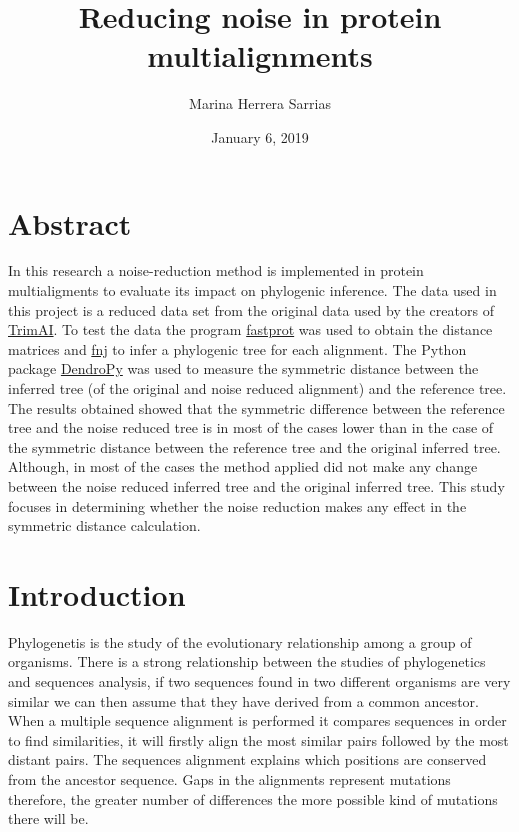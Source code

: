\documentclass[12pt]{article}
\begin{document}
		
\title{Reducing noise in protein multialignments}
\posttitle{\par\end{center}\vspace{-1em}}
\author{Marina Herrera Sarrias}
\date{January 6, 2019}                    %
\maketitle

\section{Abstract}

In this research a noise-reduction method is implemented in protein multialigments to evaluate its impact on phylogenic inference. The data used in this project is a reduced data set from the  original data used by the creators of \href{http://trimal.cgenomics.org}{TrimAI}. To test the data the program \href{http://fastphylo.sourceforge.net/}{fastprot} was used to obtain the distance matrices and \href{http://fastphylo.sourceforge.net/}{fnj} to infer a phylogenic tree for each alignment. The Python package \href{https://dendropy.org/}{DendroPy} was used to measure the symmetric distance between the inferred tree (of the original and noise reduced alignment) and the reference tree. The results obtained showed that the symmetric difference between the reference tree and the noise reduced tree is in most of the cases lower than in the case of the symmetric distance between the reference tree and the original inferred tree. Although, in most of the cases the method applied did not make any change between the noise reduced inferred tree and the original inferred tree. This study focuses in determining whether the noise reduction makes any effect in the symmetric distance calculation.

\section{Introduction}
Phylogenetis is the study of the evolutionary relationship among a group of organisms. There is a strong relationship between the studies of phylogenetics and sequences analysis, if two sequences found in two  different organisms are very similar we can then assume that they have derived from a common ancestor. When a multiple sequence alignment is performed it compares sequences in order to find similarities, it will firstly align the most similar pairs followed by the most distant pairs. The sequences alignment explains which positions are conserved from the ancestor sequence. Gaps in the alignments represent mutations therefore, the greater number of differences the more possible kind of mutations there will be.\\
\end{document}
